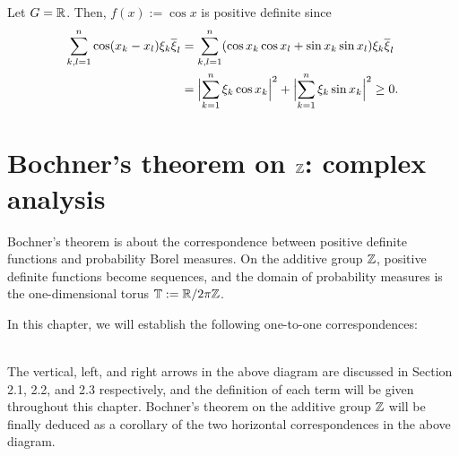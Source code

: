 \documentclass[a4paper]{article}
\begin{document}
\begin{ex}
Let $G=\R$.
Then, $f(x):=\cos x$ is positive definite since
\begin{align*}
\sum_{k,l=1}^n\cos(x_k-x_l)\xi_k\bar\xi_l
&=\sum_{k,l=1}^n(\cos x_k\cos x_l+\sin x_k\sin x_l)\xi_k\bar\xi_l\\
&=\Bigl|\sum_{k=1}^n\xi_k\cos x_k\Bigr|^2+\Bigl|\sum_{k=1}^n\xi_k\sin x_k\Bigr|^2\ge0.
\end{align*}
\end{ex}




\newpage
\section{Bochner's theorem on $\Z$: complex analysis}

Bochner's theorem is about the correspondence between positive definite functions and probability Borel measures.
On the additive group $\Z$, positive definite functions become sequences, and the domain of probability measures is the one-dimensional torus $\T:=\R/2\pi\Z$.

In this chapter, we will establish the following one-to-one correspondences:
\begin{figure}[h]
\centering
{}
\end{figure}\\
The vertical, left, and right arrows in the above diagram are discussed in Section 2.1, 2.2, and 2.3 respectively, and the definition of each term will be given throughout this chapter.
Bochner's theorem on the additive group $\Z$ will be finally deduced as a corollary of the two horizontal correspondences in the above diagram.
\end{document}
